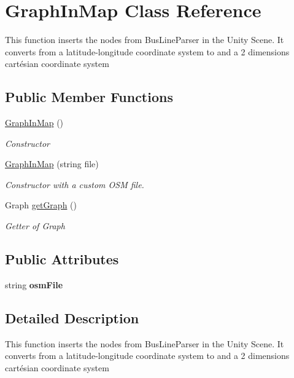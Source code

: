\hypertarget{classGraphInMap}{}\section{Graph\+In\+Map Class Reference}
\label{classGraphInMap}


This function inserts the nodes from {\ttfamily Bus\+Line\+Parser} in the Unity Scene. It converts from a latitude-\/longitude coordinate system to and a 2 dimensions cartésian coordinate system  


\subsection*{Public Member Functions}
\begin{DoxyCompactItemize}
\item 
\hyperlink{classGraphInMap_ae90bf398b6c8d18784d8d01f28ad1da0}{Graph\+In\+Map} ()
\begin{DoxyCompactList}\small\item\em Constructor \end{DoxyCompactList}\item 
\hyperlink{classGraphInMap_ac9b024f6f816f9451702f1b9a829aa0a}{Graph\+In\+Map} (string file)
\begin{DoxyCompactList}\small\item\em Constructor with a custom O\+SM file. \end{DoxyCompactList}\item 
Graph \hyperlink{classGraphInMap_a399e9c51b1492837c7d71b9a729a84ad}{get\+Graph} ()
\begin{DoxyCompactList}\small\item\em Getter of {\ttfamily Graph} \end{DoxyCompactList}\end{DoxyCompactItemize}
\subsection*{Public Attributes}
\begin{DoxyCompactItemize}
\item 
\mbox{\label{classGraphInMap_a612a84b6c2a70a8f5fd73db6cc012ae3}} 
string {\bfseries osm\+File}
\end{DoxyCompactItemize}


\subsection{Detailed Description}
This function inserts the nodes from {\ttfamily Bus\+Line\+Parser} in the Unity Scene. It converts from a latitude-\/longitude coordinate system to and a 2 dimensions cartésian coordinate system 

